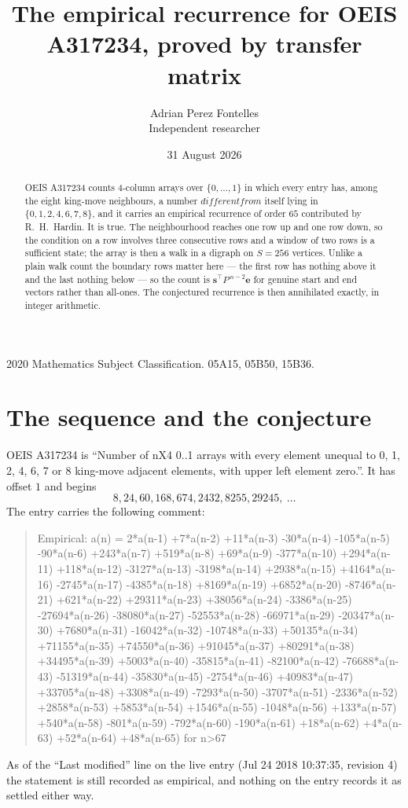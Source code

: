 \documentclass[11pt,a4paper]{article}
\title{The empirical recurrence for OEIS A317234, proved by transfer matrix}
\author{Adrian Perez Fontelles\\ \small Independent researcher}
\date{31 August 2026}
\theoremstyle{plain}
\theoremstyle{definition}
\begin{document}
\maketitle

\begin{abstract}
OEIS A317234 counts $4$-column arrays over $\{0,\dots,1\}$ in which every entry has,
among the eight king-move neighbours, a number $different from$ itself lying in $\{0,1,2,4,6,7,8\}$, and it carries an empirical
recurrence of order $65$ contributed by R.~H.~Hardin. It is true. The neighbourhood
reaches one row up and one row down, so the condition on a row involves three consecutive
rows and a window of two rows is a sufficient state; the array is then a walk in a digraph
on $S=256$ vertices. Unlike a plain walk count the boundary rows matter here --- the first
row has nothing above it and the last nothing below --- so the count is
$\mathbf{s}^{\!\top}P^{\,n-2}\mathbf{e}$ for genuine start and end vectors rather than
all-ones. The conjectured recurrence is then annihilated exactly, in integer arithmetic.
\end{abstract}

\noindent\small 2020 Mathematics Subject Classification. 05A15, 05B50, 15B36.\normalsize

\section{The sequence and the conjecture}

OEIS A317234 is ``Number of nX4 0..1 arrays with every element unequal to 0, 1, 2, 4, 6, 7 or 8 king-move adjacent elements, with upper left element zero.''. It has offset
$1$ and begins
\[
8, 24, 60, 168, 674, 2432, 8255, 29245,\ \dots
\]
The entry carries the following comment:
\begin{quote}\small
Empirical: a(n) = 2*a(n-1) +7*a(n-2) +11*a(n-3) -30*a(n-4) -105*a(n-5) -90*a(n-6) +243*a(n-7) +519*a(n-8) +69*a(n-9) -377*a(n-10) +294*a(n-11) +118*a(n-12) -3127*a(n-13) -3198*a(n-14) +2938*a(n-15) +4164*a(n-16) -2745*a(n-17) -4385*a(n-18) +8169*a(n-19) +6852*a(n-20) -8746*a(n-21) +621*a(n-22) +29311*a(n-23) +38056*a(n-24) -3386*a(n-25) -27694*a(n-26) -38080*a(n-27) -52553*a(n-28) -66971*a(n-29) -20347*a(n-30) +7680*a(n-31) -16042*a(n-32) -10748*a(n-33) +50135*a(n-34) +71155*a(n-35) +74550*a(n-36) +91045*a(n-37) +80291*a(n-38) +34495*a(n-39) +5003*a(n-40) -35815*a(n-41) -82100*a(n-42) -76688*a(n-43) -51319*a(n-44) -35830*a(n-45) -2754*a(n-46) +40983*a(n-47) +33705*a(n-48) +3308*a(n-49) -7293*a(n-50) -3707*a(n-51) -2336*a(n-52) +2858*a(n-53) +5853*a(n-54) +1546*a(n-55) -1048*a(n-56) +133*a(n-57) +540*a(n-58) -801*a(n-59) -792*a(n-60) -190*a(n-61) +18*a(n-62) +4*a(n-63) +52*a(n-64) +48*a(n-65) for n>67
\end{quote}
As of the ``Last modified'' line on the live entry (Jul 24 2018 10:37:35, revision
4) the statement is still recorded as empirical, and nothing on the entry
records it as settled either way.
\end{document}
